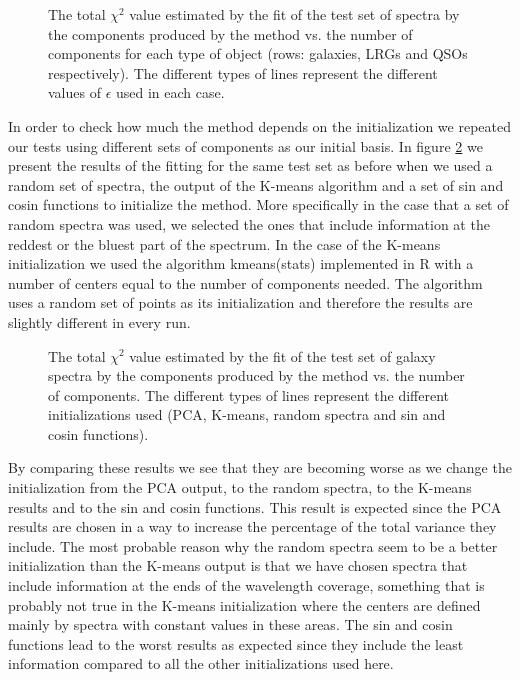 \documentclass[12pt,preprint]{aastex}
\begin{document}
\begin{figure}[h]
\caption{The total $\chi^2$ value estimated by the fit of the test set of spectra by the components produced by the method vs. the number of components for each type of object (rows: galaxies, LRGs and QSOs respectively). The different types of lines represent the different values of $\epsilon$ used in each case.}
\label{f3}
\end{figure}

In order to check how much the method depends on the initialization we repeated our tests using different sets of components as our initial basis. In figure \ref{f4} we present the results of the fitting for the same test set as before when we used a random set of spectra, the output of the K-means algorithm and a set of sin and cosin functions to initialize the method. More specifically in the case that a set of random spectra was used, we selected the ones that include information at the reddest or the bluest part of the spectrum. In the case of the K-means initialization we used the algorithm kmeans(stats) implemented in R with a number of centers equal to the number of components needed. The algorithm uses a random set of points as its initialization and therefore the results are slightly different in every run.

\begin{figure}[h]
\caption{The total $\chi^2$ value estimated by the fit of the test set of galaxy spectra by the components produced by the method vs. the number of components. The different types of lines represent the different initializations used (PCA, K-means, random spectra and sin and cosin functions).}
\label{f4}
\end{figure}

By comparing these results we see that they are becoming worse as we change the initialization from the PCA output, to the random spectra, to the K-means results and to the sin and cosin functions. This result is expected since the PCA results are chosen in a way to increase the percentage of the total variance they include. The most probable reason why the random spectra seem to be a better initialization than the K-means output is that we have chosen spectra that include information at the ends of the wavelength coverage, something that is probably not true in the K-means initialization where the centers are defined mainly by spectra with constant values in these areas. The sin and cosin functions lead to the worst results as expected since they include the least information compared to all the other initializations used here.
\end{document}
